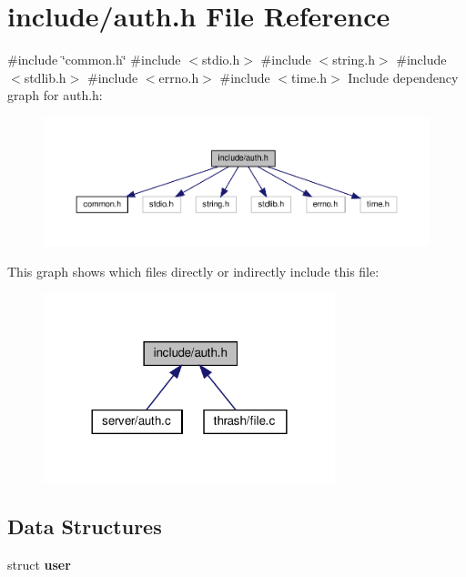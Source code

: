 \section{include/auth.h File Reference}
\label{auth_8h}
{\ttfamily \#include \char`\"{}common.\+h\char`\"{}}\newline
{\ttfamily \#include $<$stdio.\+h$>$}\newline
{\ttfamily \#include $<$string.\+h$>$}\newline
{\ttfamily \#include $<$stdlib.\+h$>$}\newline
{\ttfamily \#include $<$errno.\+h$>$}\newline
{\ttfamily \#include $<$time.\+h$>$}\newline
Include dependency graph for auth.\+h\+:\nopagebreak
\begin{figure}[H]
\begin{center}
\leavevmode
\includegraphics[width=350pt]{auth_8h__incl}
\end{center}
\end{figure}
This graph shows which files directly or indirectly include this file\+:
\nopagebreak
\begin{figure}[H]
\begin{center}
\leavevmode
\includegraphics[width=240pt]{auth_8h__dep__incl}
\end{center}
\end{figure}
\subsection*{Data Structures}
\begin{DoxyCompactItemize}
\item 
struct \textbf{ user}
\end{DoxyCompactItemize}
